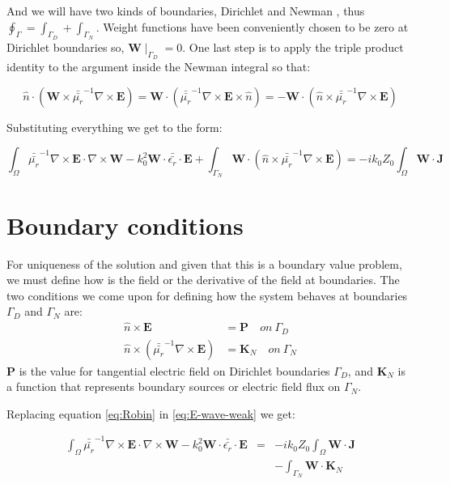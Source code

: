 And we will have two kinds of boundaries, Dirichlet and Newman \cite{Garcia2011}, thus $\oint_{\Gamma} = \int_{\Gamma_D}+\int_{\Gamma_N}$. Weight functions have been conveniently chosen to be zero at Dirichlet boundaries so, $\mathbf{W}\mid_{\Gamma_D}=0$. 
One last step is to apply the triple product identity to the argument inside the Newman integral so that:

$$\hat{n}\cdot
\left(\mathbf{W}\times\bar{\bar{\mu_r}}^{-1}
\nabla\times\mathbf{E}\right) =\mathbf{W} \cdot
 \left(\bar{\bar{\mu_r}}^{-1}
\nabla\times\mathbf{E}\times\hat{n}\right) = -\mathbf{W} \cdot
 \left(\hat{n}\times\bar{\bar{\mu_r}}^{-1}
\nabla\times\mathbf{E}\right)$$

Substituting everything we get to the form:

\begin{equation}
\int_{\Omega} \bar{\bar{\mu_r}}^{-1}\nabla\times \mathbf{E}\cdot \nabla\times\mathbf{W}
-k_0^{2}\mathbf{W}\cdot \bar{\bar{\epsilon_r}}\cdot \mathbf{E}
+ \int_{\Gamma_N} \mathbf{W} \cdot
 \left(\hat{n}\times\bar{\bar{\mu_r}}^{-1}
\nabla\times\mathbf{E}\right)
= -ik_0Z_0 \int_{\Omega} \mathbf{W}\cdot\mathbf{J} \label{eq:E-wave-weak} 
\end{equation}


\section{Boundary conditions}

For uniqueness of the solution and given that this is a boundary value problem, we must define how is the field or the derivative of the field at boundaries. The two conditions we come upon for defining how the system behaves at boundaries $\Gamma_D$ and $\Gamma_N$ are:
\begin{align}
\hat{n}\times\mathbf{E}&=\mathbf{P} \quad on \ \Gamma_D\\
\hat{n}\times\left(\bar{\bar{\mu_r}}^{-1}
\nabla\times \mathbf{E}\right) &=\mathbf{K}_N \quad on \ \Gamma_N \label{eq:Robin}
\end{align}
$\mathbf{P}$ is the value for tangential electric field on Dirichlet boundaries $\Gamma_D$,  and $\mathbf{K}_N$ is a function that represents boundary sources or electric field flux on $\Gamma_N$. 

Replacing equation \ref{eq:Robin} in \ref{eq:E-wave-weak} we get:

\begin{equation}
\begin{array}{rcl}
\int_{\Omega} \bar{\bar{\mu_r}}^{-1}\nabla\times \mathbf{E}\cdot \nabla\times\mathbf{W}
-k_0^{2}\mathbf{W}\cdot \bar{\bar{\epsilon_r}}\cdot \mathbf{E}
&=& -ik_0Z_0 \int_{\Omega} \mathbf{W}\cdot\mathbf{J} \label{eq:E-wave-weak_3} \\
&&- \int_{\Gamma_N} \mathbf{W} \cdot\mathbf{K}_N 
\end{array}
\end{equation}

